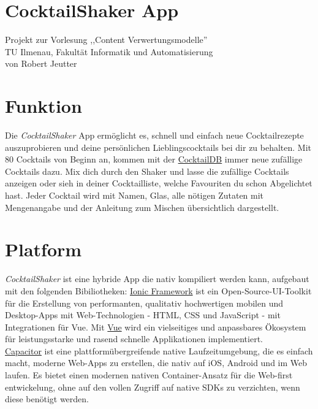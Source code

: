 \documentclass[a4paper, 10pt]{article}
\begin{document}
\section*{\centering CocktailShaker App}

\vspace{\baselineskip}
\begin{center}
    Projekt zur Vorlesung ,,Content Verwertungsmodelle''\\
    TU Ilmenau, Fakultät Informatik und Automatisierung \\
    von Robert Jeutter
\end{center}
\bigskip

\begin{multicols}{2}

    \section{Funktion}
    Die \textit{CocktailShaker} App ermöglicht es, schnell und einfach neue Cocktailrezepte auszuprobieren und deine persönlichen Lieblingscocktails bei dir zu behalten.
    Mit 80 Cocktails von Beginn an, kommen mit der \href{https://www.thecocktaildb.com/}{CocktailDB} immer neue zufällige Cocktails dazu. Mix dich durch den Shaker und lasse die zufällige Cocktails anzeigen oder sieh in deiner Cocktailliste, welche Favouriten du schon Abgelichtet hast.
    Jeder Cocktail wird mit Namen, Glas, alle nötigen Zutaten mit Mengenangabe und der Anleitung zum Mischen übersichtlich dargestellt.

    \section{Platform}
    \textit{CocktailShaker} ist eine hybride App die nativ kompiliert werden kann, aufgebaut mit den folgenden Bibiliotheken:
    \href{https://github.com/ionic-team/ionic}{Ionic Framework} ist ein Open-Source-UI-Toolkit für die Erstellung von performanten, qualitativ hochwertigen mobilen und Desktop-Apps mit Web-Technologien - HTML, CSS und JavaScript - mit Integrationen für Vue. Mit \href{https://github.com/vuejs/vue}{Vue} wird ein vielseitiges und anpassbares Ökosystem für leistungsstarke und rasend schnelle Applikationen implementiert.\\
    \href{https://github.com/ionic-team/capacitor}{Capacitor} ist eine plattformübergreifende native Laufzeitumgebung, die es einfach macht, moderne Web-Apps zu erstellen, die nativ auf iOS, Android und im Web laufen. Es bietet einen modernen nativen Container-Ansatz für die Web-first entwickelung, ohne auf den vollen Zugriff auf native SDKs zu verzichten, wenn 
    diese benötigt werden.


\end{multicols}
\end{document}
